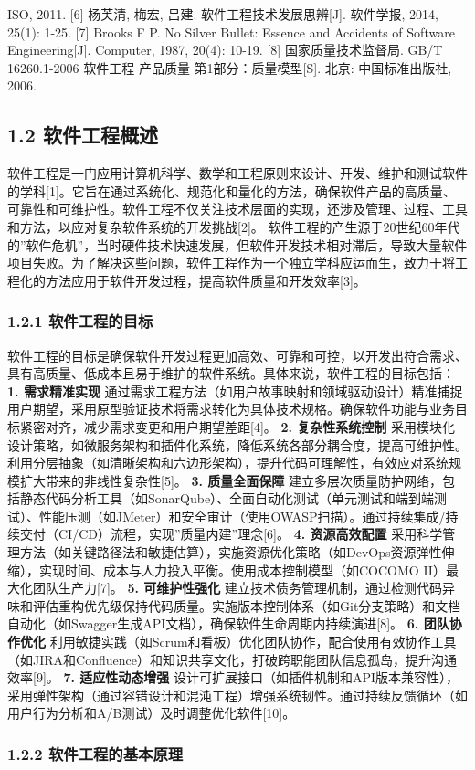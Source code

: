 ISO, 2011. {[}6{]} 杨芙清, 梅宏, 吕建. 软件工程技术发展思辨{[}J{]}. 软件学报, 2014, 25(1): 1-25. {[}7{]} Brooks F P. No Silver Bullet: Essence and Accidents of Software Engineering{[}J{]}. Computer, 1987, 20(4): 10-19. {[}8{]} 国家质量技术监督局. GB/T 16260.1-2006 软件工程 产品质量 第1部分：质量模型{[}S{]}. 北京: 中国标准出版社, 2006.

\subsection{1.2 软件工程概述}\label{ux8f6fux4ef6ux5de5ux7a0bux6982ux8ff0} 软件工程是一门应用计算机科学、数学和工程原则来设计、开发、维护和测试软件的学科{[}1{]}。它旨在通过系统化、规范化和量化的方法，确保软件产品的高质量、可靠性和可维护性。软件工程不仅关注技术层面的实现，还涉及管理、过程、工具和方法，以应对复杂软件系统的开发挑战{[}2{]}。 软件工程的产生源于20世纪60年代的''软件危机''，当时硬件技术快速发展，但软件开发技术相对滞后，导致大量软件项目失败。为了解决这些问题，软件工程作为一个独立学科应运而生，致力于将工程化的方法应用于软件开发过程，提高软件质量和开发效率{[}3{]}。 \subsubsection{1.2.1 软件工程的目标}\label{ux8f6fux4ef6ux5de5ux7a0bux7684ux76eeux6807} 软件工程的目标是确保软件开发过程更加高效、可靠和可控，以开发出符合需求、具有高质量、低成本且易于维护的软件系统。具体来说，软件工程的目标包括： \textbf{1. 需求精准实现} 通过需求工程方法（如用户故事映射和领域驱动设计）精准捕捉用户期望，采用原型验证技术将需求转化为具体技术规格。确保软件功能与业务目标紧密对齐，减少需求变更和用户期望差距{[}4{]}。 \textbf{2. 复杂性系统控制} 采用模块化设计策略，如微服务架构和插件化系统，降低系统各部分耦合度，提高可维护性。利用分层抽象（如清晰架构和六边形架构），提升代码可理解性，有效应对系统规模扩大带来的非线性复杂性{[}5{]}。 \textbf{3. 质量全面保障} 建立多层次质量防护网络，包括静态代码分析工具（如SonarQube）、全面自动化测试（单元测试和端到端测试）、性能压测（如JMeter）和安全审计（使用OWASP扫描）。通过持续集成/持续交付（CI/CD）流程，实现''质量内建''理念{[}6{]}。 \textbf{4. 资源高效配置} 采用科学管理方法（如关键路径法和敏捷估算），实施资源优化策略（如DevOps资源弹性伸缩），实现时间、成本与人力投入平衡。使用成本控制模型（如COCOMO II）最大化团队生产力{[}7{]}。 \textbf{5. 可维护性强化} 建立技术债务管理机制，通过检测代码异味和评估重构优先级保持代码质量。实施版本控制体系（如Git分支策略）和文档自动化（如Swagger生成API文档），确保软件生命周期内持续演进{[}8{]}。 \textbf{6. 团队协作优化} 利用敏捷实践（如Scrum和看板）优化团队协作，配合使用有效协作工具（如JIRA和Confluence）和知识共享文化，打破跨职能团队信息孤岛，提升沟通效率{[}9{]}。 \textbf{7. 适应性动态增强} 设计可扩展接口（如插件机制和API版本兼容性），采用弹性架构（通过容错设计和混沌工程）增强系统韧性。通过持续反馈循环（如用户行为分析和A/B测试）及时调整优化软件{[}10{]}。 \subsubsection{1.2.2 软件工程的基本原理}\label{ux8f6fux4ef6ux5de5ux7a0bux7684ux57faux672cux539fux7406} 